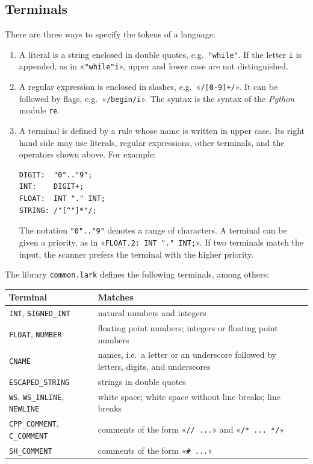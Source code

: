 \documentclass[11pt,a4paper]{article}
\newcommand{\blue}[1]{{\color{blue}#1}}
\newenvironment{unbreakable}{\par\noindent\begin{minipage}{\linewidth}}{\end{minipage}\par}
\begin{document}
\subsection{Terminals}
There are three ways to specify the tokens of a language:
\begin{enumerate}
\item A \blue{literal} is a string enclosed in double quotes, e.g.~\verb|"while"|.  If the letter \texttt{i}
      is appended, as in «\verb|"while"i|», upper and lower case are not distinguished.
\item A \blue{regular expression} is enclosed in slashes, e.g.~«\verb|/[0-9]+/|».  It can be followed by flags,
      e.g.~«\verb|/begin/i|».  The syntax is the syntax of the \textsl{Python} module \texttt{re}.
\item A \blue{terminal} is defined by a rule whose name is written in upper case.  Its right hand side may
      use literals, regular expressions, other terminals, and the operators shown above.  For example:
\begin{unbreakable}
\begin{verbatim}
DIGIT:  "0".."9";
INT:    DIGIT+;
FLOAT:  INT "." INT;
STRING: /"[^"]*"/;
\end{verbatim}
\end{unbreakable}
      The notation \verb|"0".."9"| denotes a range of characters.  A terminal can be given a priority, as in
      «\verb|FLOAT.2: INT "." INT;|».  If two terminals match the input, the scanner prefers the terminal with
      the higher priority.
\end{enumerate}
The library \texttt{common.lark} defines the following terminals, among others:
\begin{center}
\begin{tabular}{l>{\raggedright\arraybackslash}p{10.3cm}}
\toprule
\textbf{Terminal}        & \textbf{Matches} \\
\midrule
\texttt{INT}, \texttt{SIGNED\_INT}             & natural numbers and integers \\
\texttt{FLOAT}, \texttt{NUMBER}                & floating point numbers; integers or floating point numbers \\
\texttt{CNAME}                                 & names, i.e.~a letter or an underscore followed by letters,
                                                 digits, and underscores \\
\texttt{ESCAPED\_STRING}                       & strings in double quotes \\
\texttt{WS}, \texttt{WS\_INLINE}, \texttt{NEWLINE}
                                               & white space; white space without line breaks; line breaks \\
\texttt{CPP\_COMMENT}, \texttt{C\_COMMENT}     & comments of the form «\verb|// ...|» and «\verb|/* ... */|» \\
\texttt{SH\_COMMENT}                           & comments of the form «\verb|# ...|» \\
\bottomrule
\end{tabular}
\end{center}
\end{document}
